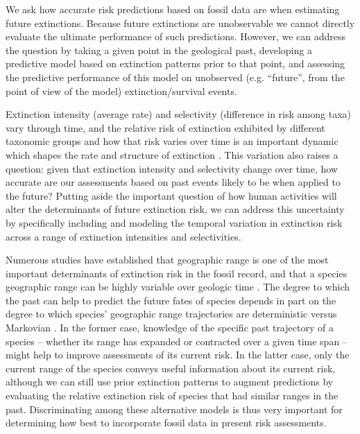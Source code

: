 \documentclass[12pt,letterpaper]{article}
\begin{document}
\begin{refsection}
We ask how accurate risk predictions based on fossil data are when estimating future extinctions. Because future extinctions are unobservable we cannot directly evaluate the ultimate performance of such predictions. However, we can address the question by taking a given point in the geological past, developing a predictive model based on extinction patterns prior to that point, and assessing the predictive performance of this model on unobserved (e.g. ``future'', from the point of view of the model) extinction/survival events.

Extinction intensity (average rate) and selectivity (difference in risk among taxa) vary through time, and the relative risk of extinction exhibited by different taxonomic groups and how that risk varies over time is an important dynamic which shapes the rate and structure of extinction \citep{Payne2007,Payne2016,Ezard2011,Smits2019}. This variation also raises a question: given that extinction intensity and selectivity change over time, how accurate are our assessments based on past events likely to be when applied to the future? Putting aside the important question of how human activities will alter the determinants of future extinction risk, we can address this uncertainty by specifically including and modeling the temporal variation in extinction risk across a range of extinction intensities and selectivities.

Numerous studies have established that geographic range is one of the most important determinants of extinction risk in the fossil record, and that a species geographic range can be highly variable over geologic time \citep{Foote2007,Liow2010,Liow2007,Kiessling2013,Payne2007,Jablonski2003,Jablonski2008,Jablonski2006}. The degree to which the past can help to predict the future fates of species depends in part on the degree to which species’ geographic range trajectories are deterministic versus Markovian \citep{Liow2007,Kiessling2013,Foote2007b,Pigot2012}. In the former case, knowledge of the specific past trajectory of a species -- whether its range has expanded or contracted over a given time span -- might help to improve assessments of its current risk. In the latter case, only the current range of the species conveys useful information about its current risk, although we can still use prior extinction patterns to augment predictions by evaluating the relative extinction risk of species that had similar ranges in the past. Discriminating among these alternative models is thus very important for determining how best to incorporate fossil data in present risk assessments.


\end{refsection}
\end{document}
